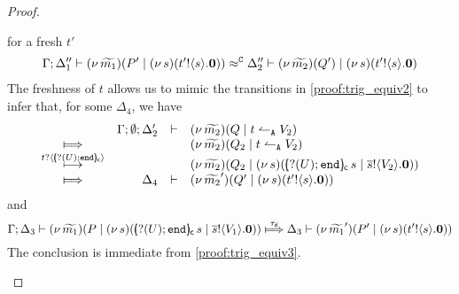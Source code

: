 \begin{proof}
\begin{enumerate}[1.]
\begin{enumerate}
							for a fresh $t'$
							\begin{eqnarray}
								\Gamma; \Delta_1'' \vdash (\nu\, \widetilde{m_1})(P' \;|\; (\nu\, s)(t' ! \langle s \rangle . \mathbf{0}) ) \approx^\mathtt{C} \Delta_2'' \vdash (\nu\, \widetilde{m_2})(Q')  \;|\; (\nu\, s)(t' ! \langle s \rangle . \mathbf{0})
								\label{proof:trig_equiv3}
							\end{eqnarray}
							The freshness of $t$ allows us to mimic the transitions
							in \eqref{proof:trig_equiv2} to infer that, for some $\Delta_4$,
							we have
							\begin{eqnarray*}
								\begin{array}{crll}
									& \Gamma; \es; \Delta_2' & \proves &		
									\newsp{\widetilde{m_2}}{Q \Par \ntrigger{t}{V_2}}
									\\
									\Hby{} &&&
									\newsp{\widetilde{m_2}}{Q_2 \Par \ntrigger{t}{V_2}}
									\\
									{\hby{\bactinp{t}{\omapchar{\btinp{U} \tinact}}}}& & &
									\newsp{\widetilde{m_2}}{Q_2 \Par \newsp{s}{\appl{\omapchar{\btinp{U} \tinact}}{s} \Par \bout{\dual{s}}{V_2} \inact}}
									\\
									\Hby{} & \Delta_4 & \proves & \newsp{\widetilde{m_2}'}{Q' \Par \newsp{s}{\bout{t'}{s} \inact} }
								\end{array}
							\end{eqnarray*}
							and 
							\[
								\horel{\Gamma}{\Delta_3}{\newsp{\widetilde{m_1}}{P \Par \newsp{s}{ \appl{\omapchar{\btinp{U} \tinact}}{s} \Par \bout{\dual{s}}{V_1} \inact}}}
								{\Hby{\dtau}}
								{\Delta_3}{\newsp{\widetilde{m_1}'}{P' \Par \newsp{s}{ \bout{t'}{s} \inact}}}
							\]
							The conclusion is immediate from \eqref{proof:trig_equiv3}.


\end{enumerate}
\end{enumerate}
\end{proof}
